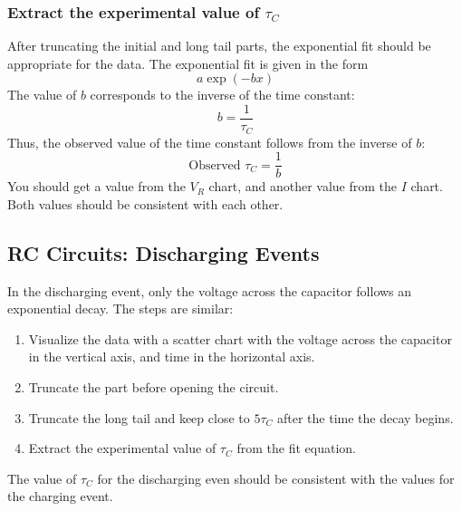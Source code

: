 \subsubsection{Extract the experimental value of $\tau_{C}$}
After truncating the initial and long tail parts, the exponential fit should be appropriate for the data. The exponential fit is given in the form
\begin{equation}
    a \exp(-bx)
\end{equation}
The value of $b$ corresponds to the inverse of the time constant:
\begin{equation}
    b = \frac{1}{\tau_{C}}
\end{equation}
Thus, the observed value of the time constant follows from the inverse of $b$:
\begin{equation}
    \text{Observed } \tau_{C} = \frac{1}{b}
\end{equation}
You should get a value from the $V_{R}$ chart, and another value from the $I$ chart. Both values should be consistent with each other.
\subsection{RC Circuits: Discharging Events}
In the discharging event, only the voltage across the capacitor follows an exponential decay. The steps are similar:
\begin{enumerate}
    \item Visualize the data with a scatter chart with the voltage across the capacitor in the vertical axis, and time in the horizontal axis.
    \item Truncate the part before opening the circuit.
    \item Truncate the long tail and keep close to $5\tau_{C}$ after the time the decay begins.
    \item Extract the experimental value of $\tau_{C}$ from the fit equation.
\end{enumerate}
The value of $\tau_{C}$ for the discharging even should be consistent with the values for the charging event.
